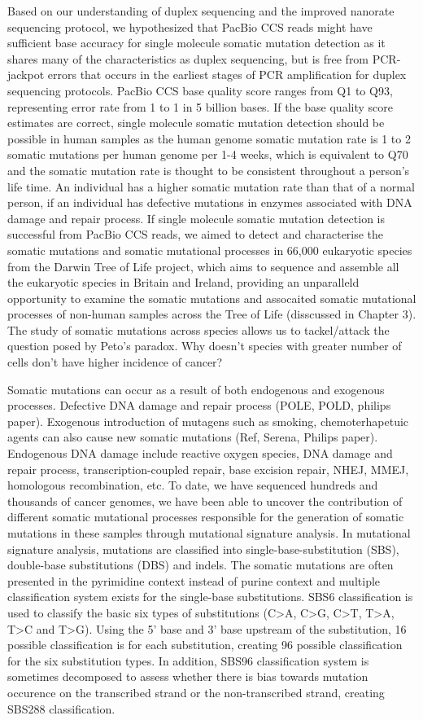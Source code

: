 Based on our understanding of duplex sequencing and the improved nanorate sequencing protocol, we hypothesized that PacBio CCS reads might have sufficient base accuracy for single molecule somatic mutation detection as it shares many of the characteristics as duplex sequencing, but is free from PCR-jackpot errors that occurs in the earliest stages of PCR amplification for duplex sequencing protocols. PacBio CCS base quality score ranges from Q1 to Q93, representing error rate from 1 to 1 in 5 billion bases. If the base quality score estimates are correct, single molecule somatic mutation detection should be possible in human samples as the human genome somatic mutation rate is 1 to 2 somatic mutations per human genome per 1-4 weeks, which is equivalent to Q70 and the somatic mutation rate is thought to be consistent throughout a person's life time. An individual has a higher somatic mutation rate than that of a normal person, if an individual has defective mutations in enzymes associated with DNA damage and repair process. If single molecule somatic mutation detection is successful from PacBio CCS reads, we aimed to detect and characterise the somatic mutations and somatic mutational processes in 66,000 eukaryotic species from the Darwin Tree of Life project, which aims to sequence and assemble all the eukaryotic species in Britain and Ireland, providing an unparalleld opportunity to examine the somatic mutations and assocaited somatic mutational processes of non-human samples across the Tree of Life (disscussed in Chapter 3). The study of somatic mutations across species allows us to tackel/attack the question posed by Peto's paradox. Why doesn't species with greater number of cells don't have higher incidence of cancer?

Somatic mutations can occur as a result of both endogenous and exogenous processes. Defective DNA damage and repair process (POLE, POLD, philips paper). Exogenous introduction of mutagens such as smoking, chemoterhapetuic agents can also cause new somatic mutations (Ref, Serena, Philips paper). Endogenous DNA damage include reactive oxygen species, DNA damage and repair process, transcription-coupled repair, base excision repair, NHEJ, MMEJ, homologous recombination, etc. To date, we have sequenced hundreds and thousands of cancer genomes, we have been able to uncover the contribution of different somatic mutational processes responsible for the generation of somatic mutations in these samples through mutational signature analysis. In mutational signature analysis, mutations are classified into single-base-substitution (SBS), double-base substitutions (DBS) and indels. The somatic mutations are often presented in the pyrimidine context instead of purine context and multiple classification system exists for the single-base substitutions. SBS6 classification is used to classify the basic six types of substitutions (C>A, C>G, C>T, T>A, T>C and T>G). Using the 5' base and 3' base upstream of the substitution, 16 possible classification is for each substitution, creating 96 possible classification for the six substitution types. In addition, SBS96 classification system is sometimes decomposed to assess whether there is bias towards mutation occurence on the transcribed strand or the non-transcribed strand, creating SBS288 classification.     


